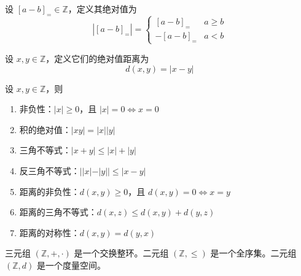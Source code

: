 \vspace{1em}

\begin{definition}
    设 $[a-b]_{=}\in\mathbb{Z}$，定义其绝对值为
    \[
        |[a-b]_{=}| = 
        \begin{cases}
            [a-b]_{=} & a\geq b \\
            -[a-b]_{=} & a < b
        \end{cases}
    \]
\end{definition}

\begin{definition}
    设 $x,y\in\mathbb{Z}$，定义它们的绝对值距离为
    \[
        d(x,y) = |x-y|
    \]
\end{definition}

\begin{theorem}
    设 $x,y\in\mathbb{Z}$，则
    \begin{enumerate}
        \item 非负性：$|x|\geq 0$，且 $|x|=0 \iff x=0$
        \item 积的绝对值：$|xy|=|x||y|$
        \item 三角不等式：$|x+y|\leq |x|+|y|$
        \item 反三角不等式：$||x| - |y|| \leq |x - y|$
        \item 距离的非负性：$d(x,y) \geq 0$，且 $d(x,y)=0 \iff x=y$
        \item 距离的三角不等式：$d(x,z) \leq d(x,y) + d(y,z)$
        \item 距离的对称性：$d(x,y) = d(y,x)$
    \end{enumerate}
\end{theorem}

\vspace{1em}

\begin{note}
    三元组 $(\mathbb{Z},+,\cdot)$ 是一个交换整环。二元组 $(\mathbb{Z},\leq)$ 是一个全序集。二元组 $(\mathbb{Z},d)$ 是一个度量空间。
\end{note}

\newpage